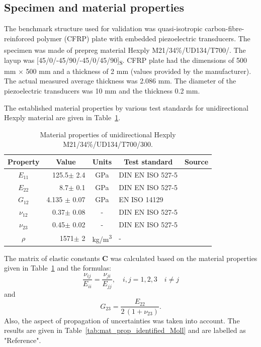\documentclass[preprint,12pt]{elsarticle}
\newcommand{\matr}[1]{\mathbf{#1}} %
\begin{document}
\subsection{Specimen and material properties \label{sec:spec}}
The benchmark structure used for validation was quasi-isotropic carbon-fibre-reinforced polymer (CFRP) plate with embedded piezoelectric transducers. 
The specimen was made of prepreg material Hexply\textsuperscript{\textregistered} M21/34\%/\-UD134/\-T700/.
The layup was [45/0/-45/90/-45/0/45/90]\textsubscript{S}. 
CFRP plate had the dimensions of 500 mm \(\times\) 500 mm and a thickness of 2 mm 
(values provided by the manufacturer). 
The actual measured average thickness was 2.086 mm. 
The diameter of the piezoelectric transducers was 10 mm and the thickness 0.2 mm. 

The established material properties by various test standards for unidirectional Hexply material are given in Table~\ref{tab:mat_prop_Moll}. 

\begin{table}
	\renewcommand{\arraystretch}{1.3}
	\centering \footnotesize
	\caption{Material properties of unidirectional Hexply M21/34\%/UD134/T700/300.}
		\begin{tabular}{crclc} 
			\toprule
			Property &  \multicolumn{1}{c}{Value}  & Units & \multicolumn{1}{c}{Test standard} & Source \\
			\midrule
			$E_{11}$ & 125.5$\pm$ 2.4   & GPa & DIN EN ISO 527-5 & \cite{Moll2019} \\
			$E_{22}$ & 8.7$\pm$ 0.1     & GPa & DIN EN ISO 527-5 & \cite{Moll2019} \\
			$G_{12}$ & 4.135 $\pm$ 0.07 & GPa & EN ISO 14129 & \cite{Petersen2016} \\
			$\nu_{12}$ & 0.37$\pm$ 0.08 & -   & DIN EN ISO 527-5 & \cite{Moll2019} \\
			$\nu_{23}$ & 0.45$\pm$ 0.02 & -   & DIN EN ISO 527-5 & \cite{Moll2019} \\
			$\rho$ & 1571$\pm$ 2 & kg/m\textsuperscript{3}   & - & \cite{Moll2019} \\
			\bottomrule 
		\end{tabular} 
		\label{tab:mat_prop_Moll}
\end{table}
The matrix of elastic constants $\matr{C}$ was calculated based on the material properties given in Table~\ref{tab:mat_prop_Moll} and the formulas:
\begin{equation}
	\frac{\nu_{ij}}{E_{ii}}=\frac{\nu_{ji}}{E_{jj}},\quad i,j=1,2,3\quad i\ne j
	\label{eq:recalc}
\end{equation}
and 
\begin{equation}
	G_{23} = \frac{E_{22}}{2\,(1+\nu_{23})}.
	\label{eq:recalc2}
\end{equation}
Also, the aspect of propagation of uncertainties was taken into account.
The results are given in Table~\ref{tab:mat_prop_identified_Moll} and are labelled as "Reference".
\end{document}
